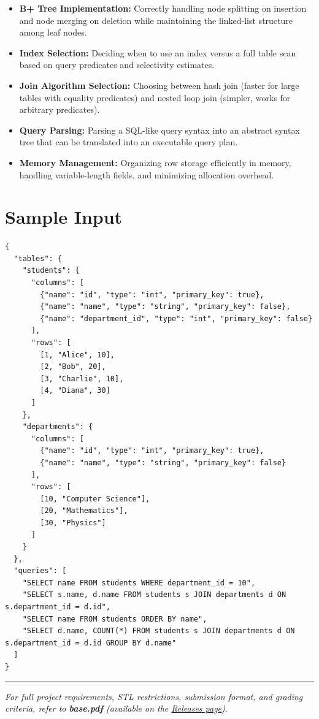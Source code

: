 \begin{itemize}
  \item \textbf{B+ Tree Implementation:} Correctly handling node splitting on insertion and node merging on deletion while maintaining the linked-list structure among leaf nodes.
  \item \textbf{Index Selection:} Deciding when to use an index versus a full table scan based on query predicates and selectivity estimates.
  \item \textbf{Join Algorithm Selection:} Choosing between hash join (faster for large tables with equality predicates) and nested loop join (simpler, works for arbitrary predicates).
  \item \textbf{Query Parsing:} Parsing a SQL-like query syntax into an abstract syntax tree that can be translated into an executable query plan.
  \item \textbf{Memory Management:} Organizing row storage efficiently in memory, handling variable-length fields, and minimizing allocation overhead.
\end{itemize}

\section{Sample Input}

\begin{lstlisting}[style=json, caption={data/input\_sample.json}]
{
  "tables": {
    "students": {
      "columns": [
        {"name": "id", "type": "int", "primary_key": true},
        {"name": "name", "type": "string", "primary_key": false},
        {"name": "department_id", "type": "int", "primary_key": false}
      ],
      "rows": [
        [1, "Alice", 10],
        [2, "Bob", 20],
        [3, "Charlie", 10],
        [4, "Diana", 30]
      ]
    },
    "departments": {
      "columns": [
        {"name": "id", "type": "int", "primary_key": true},
        {"name": "name", "type": "string", "primary_key": false}
      ],
      "rows": [
        [10, "Computer Science"],
        [20, "Mathematics"],
        [30, "Physics"]
      ]
    }
  },
  "queries": [
    "SELECT name FROM students WHERE department_id = 10",
    "SELECT s.name, d.name FROM students s JOIN departments d ON s.department_id = d.id",
    "SELECT name FROM students ORDER BY name",
    "SELECT d.name, COUNT(*) FROM students s JOIN departments d ON s.department_id = d.id GROUP BY d.name"
  ]
}
\end{lstlisting}

\vfill
\noindent\rule{\textwidth}{0.4pt}
{\small\textit{For full project requirements, STL restrictions, submission format, and grading criteria, refer to \textbf{base.pdf} (available on the \href{https://github.com/BestSithInEU/cse211-term-projects/releases}{Releases page}).}}

